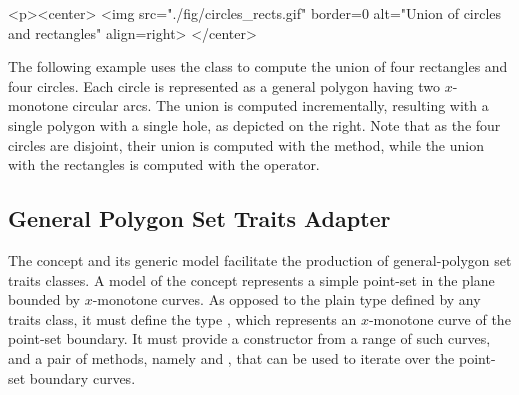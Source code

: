 \lcTex{%
  \setlength{\widthRight}{2.4cm}
  \setlength{\widthLeft}{\widthLineReal}
  \addtolength{\widthLeft}{-\widthRight}
  \begin{minipage}{\widthLeft}
}
\label{fig:circle_recs}
\begin{ccHtmlOnly}
  <p><center>
    <img src="./fig/circles_rects.gif" border=0 alt="Union of circles
    and rectangles" align=right>
  </center>
\end{ccHtmlOnly}
The following example uses the  class
to compute the union of four rectangles and four circles. Each circle
is represented as a general polygon having two $x$-monotone circular arcs.
The union is computed incrementally, resulting with a single polygon with
a single hole, as depicted on the right. Note that as the four circles are
disjoint, their union is computed with the  method, while the
union with the rectangles is computed with the  operator.
\\


\subsection{General Polygon Set Traits Adapter}
\label{bso_ssec:general_polygon_concept}

The concept  and its generic model 
 facilitate the 
production of general-polygon set traits classes. A model of the concept 
 represents a simple point-set in the plane bounded 
by $x$-monotone curves. As opposed to the plain  type 
defined by any traits class, it must define the type 
, which represents an $x$-monotone curve of the 
point-set boundary. It must provide a constructor from a range of such 
curves, and a pair of methods, namely  and 
, that can be used to iterate over the point-set boundary 
curves.
 
